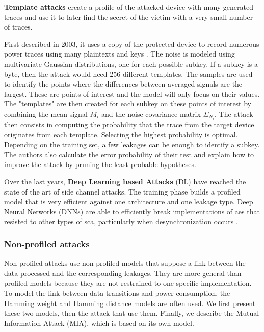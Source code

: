 \documentclass[11pt]{sdm}
\begin{document}
\textbf{Template attacks} create a profile of the attacked device with many generated traces and use it to later find the secret of the victim with a very small number of traces.

First described in 2003, it uses a copy of the protected device to record numerous power traces using many plaintexts and keys \parencite{Chari_Rao_Rohatgi_2003}.
The noise is modeled using multivariate Gaussian distributions, one for each possible subkey.
If a subkey is a byte, then the attack would need 256 different templates.
The samples are used to identify the points where the differences between averaged signals are the largest.
These are points of interest and the model will only focus on their values.
The "templates" are then created for each subkey on these points of interest by combining the mean signal $M_i$ and the noise covariance matrix $\Sigma_{N_i}$.
The attack then consists in computing the probability that the trace from the target device originates from each template.
Selecting the highest probability is optimal.
Depending on the training set, a few leakages can be enough to identify a subkey.
The authors also calculate the error probability of their test and explain how to improve the attack by pruning the least probable hypotheses.


Over the last years, \textbf{Deep Learning based Attacks} (DL) have reached the state of the art of side channel attacks.
The training phase builds a profiled model that is very efficient against one architecture and one leakage type.
Deep Neural Networks (DNNs) are able to efficiently break implementations of \gls{aes} that resisted to other types of \gls{sca}, particularly when desynchronization occurs \parencite{Maghrebi_Portigliatti_Prouff_2016}.

\subsubsection{Non-profiled attacks}

Non-profiled attacks use non-profiled models that suppose a link between the data processed and the corresponding leakages.
They are more general than profiled models because they are not restrained to one specific implementation.
To model the link between data transitions and power consumption, the Hamming weight and Hamming distance models are often used.
We first present these two models, then the attack that use them.
Finally, we describe the Mutual Information Attack (MIA), which is based on its own model.
\end{document}
